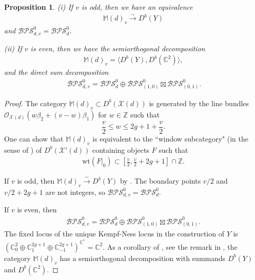 \documentclass [11pt,oneside,a4paper,mathscr]{amsart}
\newtheorem{prop}[thm]{Proposition}
\theoremstyle{definition}
\renewcommand{\leq}{\leqslant}
\newcommand{\X}{\mathscr{X}}
\begin{document}
\begin{prop}\label{prop82}
(i) If $v$ is odd, then 
we have an equivalence \begin{align*}\mathbb{M}(d)_v \stackrel{\sim}{\to} D^b(Y)
\end{align*}
and $\mathcal{BPS}^0_{d,v}=\mathcal{BPS}^0_d$.

(ii) If $v$ is even, then we have the semiorthogonal decomposition 
\begin{align*}\mathbb{M}(d)_v=\langle D^b(Y), D^b(\mathbb{C}^2) \rangle, 
\end{align*}
and the direct sum decomposition 
\begin{align*}
\ \mathcal{BPS}^0_{d,v}=\mathcal{BPS}^0_d\oplus \mathcal{BPS}^0_{(1,0)}\boxtimes \mathcal{BPS}^0_{(0,1)}.
\end{align*}
\end{prop}

\begin{proof}
    The category $\mathbb{M}(d)_v \subset D^b(\X(d))$ is generated by the line bundles $\mathcal{O}_{\X(d)}(w\beta_2+(v-w)\beta_1)$ for $w\in \mathbb{Z}$ such that 
    \begin{equation}\label{boundsprop83}
    \frac{v}{2}\leq w\leq 2g+1+\frac{v}{2}.
    \end{equation}
    One can show that $\mathbb{M}(d)_v$ is equivalent to the ``window subcategory" (in the sense of \cite{halp}) of $D^b(\X'(d))$ containing objects $F$ such that 
    \begin{align*}
        \mathrm{wt}(F|_{0}) \subset \left[\frac{v}{2}, \frac{v}{2}+2g+1  \right] \cap \mathbb{Z}. 
    \end{align*}
    
    If $v$ is odd, then $\mathbb{M}(d)_v\stackrel{\sim}{\to} D^b(Y)$ by \cite[Theorem 2.10]{halp}. The boundary points 
    $v/2$ and $v/2+2g+1$ are not integers, so $\mathcal{BPS}^0_{d,v}=\mathcal{BPS}^0_d$.

    If $v$ is even, then 
    \begin{align*}\mathcal{BPS}^0_{d,v}=\mathcal{BPS}^0_d\oplus \mathcal{BPS}^0_{(1,0)}\boxtimes \mathcal{BPS}^0_{(0,1)}.
    \end{align*}
    The fixed locus of the unique Kempf-Ness locus in the construction of $Y$ is $(\mathbb{C}^2_0\oplus \mathbb{C}^{2g+1}_1\oplus \mathbb{C}^{2g+1}_{-1})^{\mathbb{C}^*}=\mathbb{C}^2$.
    As a corollary of \cite[Theorem 2.10]{halp}, see the remark in \cite[Equation (3)]{MR3552550}, the category $\mathbb{M}(d)_v$ has a semiorthogonal decomposition with summands $D^b(Y)$ and $D^b(\mathbb{C}^2)$.
\end{proof}
\end{document}
